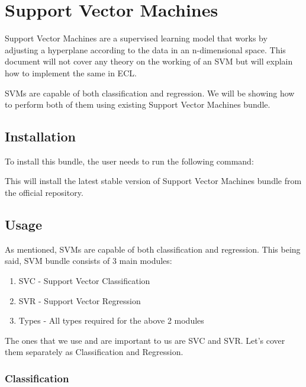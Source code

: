 
\chapter{Support Vector Machines}\label{supe:svm}

Support Vector Machines are a supervised learning model that works by adjusting a hyperplane according to the data in an n-dimensional space. This document will not cover any theory on the working of an SVM but will explain how to implement the same in ECL. 

SVMs are capable of both classification and regression. We will be showing how to perform both of them using existing Support Vector Machines bundle.

\section{Installation}

To install this bundle, the user needs to run the following command:



This will install the latest stable version of Support Vector Machines bundle from the official repository.

\section{Usage}

As mentioned, SVMs are capable of both classification and regression. This being said, SVM bundle consists of 3 main modules:

\begin{enumerate}
    \item SVC - Support Vector Classification
    \item SVR - Support Vector Regression
    \item Types - All types required for the above 2 modules
\end{enumerate}

The ones that we use and are important to us are SVC and SVR. Let's cover them separately as Classification and Regression.

\subsection{Classification}


